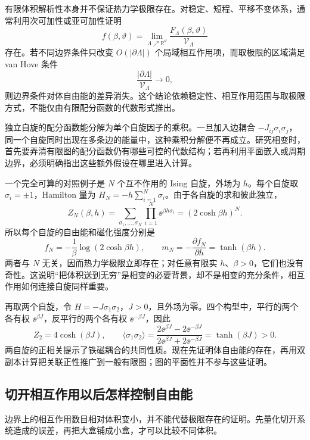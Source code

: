 有限体积解析性本身并不保证热力学极限存在。对稳定、短程、平移不变体系，通常利用次可加性或亚可加性证明
\begin{equation}
 f(\beta,\vartheta)
 =\lim_{\Lambda\nearrow\mathbb R^d}
 \frac{F_\Lambda(\beta,\vartheta)}{\mathcal V_\Lambda}
 \label{eq:phys-sm-thermodynamic-limit-general}
\end{equation}
存在。若不同边界条件只改变 \(O(|\partial\Lambda|)\) 个局域相互作用项，而取极限的区域满足 van Hove 条件
\[
 \frac{|\partial\Lambda|}{\mathcal V_\Lambda}\longrightarrow0,
\]
则边界条件对体自由能的差异消失。这个结论依赖稳定性、相互作用范围与取极限方式，不能仅由有限配分函数的代数形式推出。

独立自旋的配分函数能分解为单个自旋因子的乘积。一旦加入边耦合 \(-J_{ij}\sigma_i\sigma_j\)，同一个自旋同时出现在多条边的能量中，这种乘积分解便不再成立。研究相变时，首先要弄清有限图的配分函数仍有哪些可控的代数结构；若再利用平面嵌入或周期边界，必须明确指出这些额外假设在哪里进入计算。

一个完全可算的对照例子是 $N$ 个互不作用的 Ising 自旋，外场为 $h$。每个自旋取 $\sigma_i=\pm1$，Hamilton 量为 $H_N=-h\sum_{i=1}^N\sigma_i$。由于各自旋的求和彼此独立，
\[
 Z_N(\beta,h)
 =\sum_{\sigma_1,\ldots,\sigma_N}
   \prod_{i=1}^N \ee^{\beta h\sigma_i}
 =(2\cosh\beta h)^N.
\]
所以每个自旋的自由能和磁化强度分别是
\[
 f_N=-\frac1\beta\log(2\cosh\beta h),\qquad
 m_N=-\frac{\partial f_N}{\partial h}
     =\tanh(\beta h).
\]
两者与 $N$ 无关，因而热力学极限立即存在；对任意有限实 $h$、$\beta>0$，它们也没有奇性。这说明“把体积送到无穷”是相变的必要背景，却不是相变的充分条件，相互作用如何连接自旋同样重要。

再取两个自旋，令 $H=-J\sigma_1\sigma_2$，$J>0$，且外场为零。四个构型中，平行的两个各有权 $\ee^{\beta J}$，反平行的两个各有权 $\ee^{-\beta J}$，因此
\[
 Z_2=4\cosh(\beta J),\qquad
 \langle\sigma_1\sigma_2\rangle
 =\frac{2\ee^{\beta J}-2\ee^{-\beta J}}
        {2\ee^{\beta J}+2\ee^{-\beta J}}
 =\tanh(\beta J)>0.
\]
两自旋的正相关提示了铁磁耦合的共同性质。现在先证明体自由能的存在，再用双副本计算把关联正性推广到一般有限图；图的平面性并不参与这些证明。

\subsection{切开相互作用以后怎样控制自由能}

边界上的相互作用数目相对体积变小，并不能代替极限存在的证明。先量化切开系统造成的误差，再把大盒铺成小盒，才可以比较不同体积。

